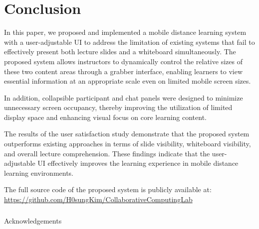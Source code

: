 \documentclass[runningheads]{llncs}
\begin{document}
\section{Conclusion}
In this paper, we proposed and implemented a mobile distance learning system with a user-adjustable UI to address the limitation of existing systems that fail to effectively present both lecture slides and a whiteboard simultaneously. The proposed system allows instructors to dynamically control the relative sizes of these two content areas through a grabber interface, enabling learners to view essential information at an appropriate scale even on limited mobile screen sizes.

In addition, collapsible participant and chat panels were designed to minimize unnecessary screen occupancy, thereby improving the utilization of limited display space and enhancing visual focus on core learning content.

The results of the user satisfaction study demonstrate that the proposed system outperforms existing approaches in terms of slide visibility, whiteboard visibility, and overall lecture comprehension. These findings indicate that the user-adjustable UI effectively improves the learning experience in mobile distance learning environments.

The full source code of the proposed system is publicly available at: \\\url{https://github.com/H0sungKim/CollaborativeComputingLab}

\begin{credits}
\subsubsection{\ackname} Acknowledgements
\end{credits}
%
%
%
% 
% 
%



\end{document}
